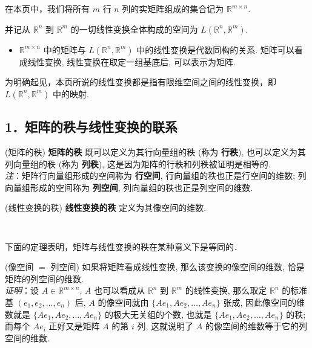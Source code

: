 
在本页中，我们将所有 $m$ 行 $n$ 列的实矩阵组成的集合记为 $\mathbb{R}^{m\times n}.$

并记从 $\mathbb{R}^{n}$ 到 $\mathbb{R}^{m}$ 的一切线性变换全体构成的空间为 $L(\mathbb{R}^{n},\mathbb{R}^{m}).$
\begin{itemize}
\item $\mathbb{R}^{m\times n}$ 中的矩阵与 $L(\mathbb{R}^{n},\mathbb{R}^{m})$
中的线性变换是代数同构的关系. 矩阵可以看成线性变换, 线性变换在取定一组基底后, 可以表示为矩阵. 
\end{itemize}

为明确起见，本页所说的线性变换都是指有限维空间之间的线性变换，即 $L(\mathbb{R}^{n},\mathbb{R}^{m})$ 中的映射.

\subsection{1．矩阵的秩与线性变换的联系}

\begin{definition}{(矩阵的秩)}
\textbf{矩阵的秩} 既可以定义为其行向量组的秩 (称为 \textbf{行秩}), 也可以定义为其列向量组的秩 (称为 \textbf{列秩}),
这是因为矩阵的行秩和列秩被证明是相等的. \\

\textsl{注}：矩阵行向量组形成的空间称为 \textbf{行空间}, 行向量组的秩也正是行空间的维数;
列向量组形成的空间称为 \textbf{列空间}, 列向量组的秩也正是列空间的维数.
\end{definition}



\begin{definition}{(线性变换的秩)}
\textbf{线性变换的秩} 定义为其像空间的维数.
\end{definition} 
\verb| |

下面的定理表明，矩阵与线性变换的秩在某种意义下是等同的．
\begin{theorem}{(像空间 $=$ 列空间)}\label{linmat_the1}
 如果将矩阵看成线性变换, 那么该变换的像空间的维数, 恰是矩阵的列空间的维数.\\

\textsl{ 证明}：设 $A\in\mathbb{R}^{m\times n}$, $A$ 也可以看成从 $\mathbb{R}^{n}$ 到 $\mathbb{R}^{m}$
的线性变换, 那么取定 $\mathbb{R}^{n}$ 的标准基 $(e_{1},e_{2},\ldots,e_{n})$ 后,
$A$ 的像空间就由 $\{Ae_{1},Ae_{2},\ldots,Ae_{n}\}$ 张成, 因此像空间的维数就是 $\{Ae_{1},Ae_{2},\ldots,Ae_{n}\}$
的极大无关组的个数, 也就是 $\{Ae_{1},Ae_{2},\ldots,Ae_{n}\}$ 的秩; 而每个 $Ae_{i}$
正好又是矩阵 $A$ 的第 $i$ 列, 这就说明了 $A$ 的像空间的维数等于它的列空间的维数. 
\end{theorem}


